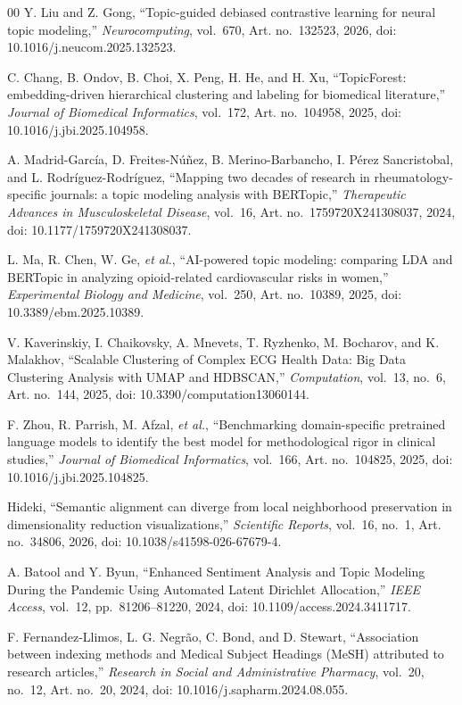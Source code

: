 \documentclass[a4paper,fleqn]{cas-dc}
\begin{document}
\begin{thebibliography}{00}
 Y. Liu and Z. Gong, ``Topic-guided debiased contrastive learning for neural topic modeling,'' \textit{Neurocomputing}, vol.~670, Art. no.~132523, 2026, doi: 10.1016/j.neucom.2025.132523.

 C. Chang, B. Ondov, B. Choi, X. Peng, H. He, and H. Xu, ``TopicForest: embedding-driven hierarchical clustering and labeling for biomedical literature,'' \textit{Journal of Biomedical Informatics}, vol.~172, Art. no.~104958, 2025, doi: 10.1016/j.jbi.2025.104958.

 A. Madrid-García, D. Freites-Núñez, B. Merino-Barbancho, I. Pérez Sancristobal, and L. Rodríguez-Rodríguez, ``Mapping two decades of research in rheumatology-specific journals: a topic modeling analysis with BERTopic,'' \textit{Therapeutic Advances in Musculoskeletal Disease}, vol.~16, Art. no.~1759720X241308037, 2024, doi: 10.1177/1759720X241308037.

 L. Ma, R. Chen, W. Ge, \textit{et al.}, ``AI-powered topic modeling: comparing LDA and BERTopic in analyzing opioid-related cardiovascular risks in women,'' \textit{Experimental Biology and Medicine}, vol.~250, Art. no.~10389, 2025, doi: 10.3389/ebm.2025.10389.

 V. Kaverinskiy, I. Chaikovsky, A. Mnevets, T. Ryzhenko, M. Bocharov, and K. Malakhov, ``Scalable Clustering of Complex ECG Health Data: Big Data Clustering Analysis with UMAP and HDBSCAN,'' \textit{Computation}, vol.~13, no.~6, Art. no.~144, 2025, doi: 10.3390/computation13060144.

 F. Zhou, R. Parrish, M. Afzal, \textit{et al.}, ``Benchmarking domain-specific pretrained language models to identify the best model for methodological rigor in clinical studies,'' \textit{Journal of Biomedical Informatics}, vol.~166, Art. no.~104825, 2025, doi: 10.1016/j.jbi.2025.104825.

 Hideki, ``Semantic alignment can diverge from local neighborhood preservation in dimensionality reduction visualizations,'' \textit{Scientific Reports}, vol.~16, no.~1, Art. no.~34806, 2026, doi: 10.1038/s41598-026-67679-4.

 A. Batool and Y. Byun, ``Enhanced Sentiment Analysis and Topic Modeling During the Pandemic Using Automated Latent Dirichlet Allocation,'' \textit{IEEE Access}, vol.~12, pp.~81206--81220, 2024, doi: 10.1109/access.2024.3411717.

 F. Fernandez-Llimos, L. G. Negrão, C. Bond, and D. Stewart, ``Association between indexing methods and Medical Subject Headings (MeSH) attributed to research articles,'' \textit{Research in Social and Administrative Pharmacy}, vol.~20, no.~12, Art. no.~20, 2024, doi: 10.1016/j.sapharm.2024.08.055.


\end{thebibliography}
\end{document}
